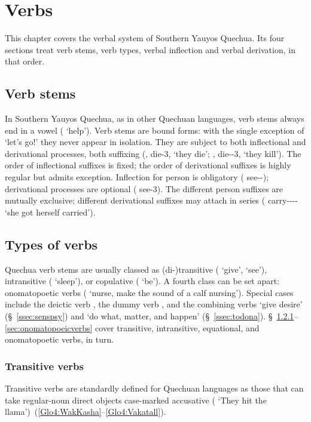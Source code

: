 \chapter{Verbs}\label{ch:verbs}
This chapter covers the verbal system of Southern Yauyos Quechua. Its four sections treat verb stems, verb types, verbal inflection and verbal derivation, in that order.

\section{Verb stems}\label{sec:verbstem}
In Southern Yauyos Quechua, as in other Quechuan languages, verb stems always end in a vowel ( ‘help’). Verb stems are bound forms: with the single exception of  ‘let’s go!’ they never appear in isolation. They are subject to both inflectional and derivational processes, both suffixing (, die-3, ‘they die’; , die--3, ‘they kill’). The order of inflectional suffixes is fixed; the order of derivational suffixes is highly regular but admits exception. Inflection for person is obligatory ( see--); derivational processes are optional ( see-3). The different person suffixes are mutually exclusive; different derivational suffixes may attach in series ( carry---- ‘she got herself carried’).

\section{Types of verbs}
Quechua verb stems are usually classed as (di-)transitive ( ‘give’,  ‘see’), intransitive ( ‘sleep’), or copulative ( ‘be’). A fourth class can be set apart: onomatopoetic verbs ( ‘nurse, make the sound of a calf nursing’). Special cases include the deictic verb , the dummy verb , and the combining verbs  ‘give desire’ (§~\ref{ssec:senspsy}) and  ‘do what, matter, and happen’ (§~\ref{ssec:todona}). §~\ref{sec:transitiveverbs}--\ref{sec:onomatopoeicverbs} cover transitive, intransitive, equational, and onomatopoetic verbs, in turn.

\subsection{Transitive verbs}\label{sec:transitiveverbs}
Transitive verbs are standardly defined for Quechuan languages as those that can take regular-noun direct objects case-marked accusative (  ‘They hit the llama’)~(\ref{Glo4:WakKasha}--\ref{Glo4:Vakatall}).\\

